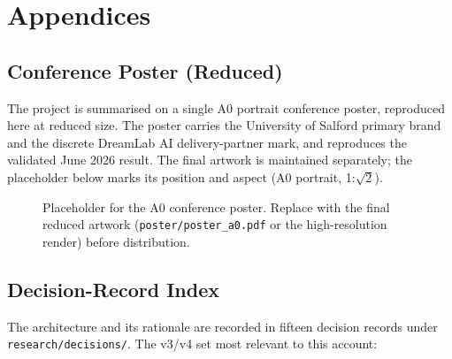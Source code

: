 \documentclass[a4paper,11pt]{report}
\newcommand{\code}[1]{\texttt{#1}}
\begin{document}
\appendix
\part*{Appendices}

\chapter{Conference Poster (Reduced)}
The project is summarised on a single A0 portrait conference poster, reproduced here at reduced size. The
poster carries the University of Salford primary brand and the discrete DreamLab AI delivery-partner mark,
and reproduces the validated June 2026 result. The final artwork is maintained separately; the placeholder
below marks its position and aspect (A0 portrait, 1:$\sqrt{2}$).

\begin{figure}[ht]
\centering
\setlength{\fboxrule}{1.2pt}\setlength{\fboxsep}{0pt}
\caption{Placeholder for the A0 conference poster. Replace with the final reduced artwork
(\code{poster/poster\_a0.pdf} or the high-resolution render) before
distribution.}\label{fig:poster}
\end{figure}

\chapter{Decision-Record Index}
The architecture and its rationale are recorded in fifteen decision records under
\code{research/decisions/}. The v3/v4 set most relevant to this account:
\end{document}

